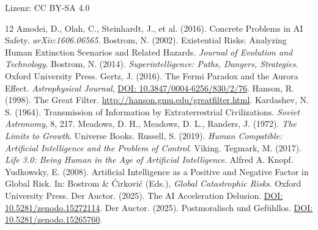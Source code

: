 \documentclass[12pt,a4paper]{article}
\begin{document}
\fussy
\vfill
\noindent Lizenz: CC BY-SA 4.0


\begin{thebibliography}{12}
 Amodei, D., Olah, C., Steinhardt, J., et al. (2016). Concrete Problems in AI Safety. \emph{arXiv:1606.06565}.
 Bostrom, N. (2002). Existential Risks: Analyzing Human Extinction Scenarios and Related Hazards. \emph{Journal of Evolution and Technology}.
 Bostrom, N. (2014). \emph{Superintelligence: Paths, Dangers, Strategies}. Oxford University Press.
 Gertz, J. (2016). The Fermi Paradox and the Aurora Effect. \emph{Astrophysical Journal}, \href{https://doi.org/10.3847/0004-6256/830/2/76}{DOI: 10.3847/0004-6256/830/2/76}.
 Hanson, R. (1998). The Great Filter. \url{http://hanson.gmu.edu/greatfilter.html}.
 Kardashev, N. S. (1964). Transmission of Information by Extraterrestrial Civilizations. \emph{Soviet Astronomy}, 8, 217.
 Meadows, D. H., Meadows, D. L., Randers, J. (1972). \emph{The Limits to Growth}. Universe Books.
 Russell, S. (2019). \emph{Human Compatible: Artificial Intelligence and the Problem of Control}. Viking.
 Tegmark, M. (2017). \emph{Life 3.0: Being Human in the Age of Artificial Intelligence}. Alfred A. Knopf.
 Yudkowsky, E. (2008). Artificial Intelligence as a Positive and Negative Factor in Global Risk. In: Bostrom \& Ćirković (Eds.), \emph{Global Catastrophic Risks}. Oxford University Press.
 Der Auctor. (2025). The AI Acceleration Delusion. \href{https://doi.org/10.5281/zenodo.15272114}{DOI: 10.5281/zenodo.15272114}.
 Der Auctor. (2025). Postmoralisch und Gefühllos. \href{https://doi.org/10.5281/zenodo.15265760}{DOI: 10.5281/zenodo.15265760}.
\end{thebibliography}
\end{document}

